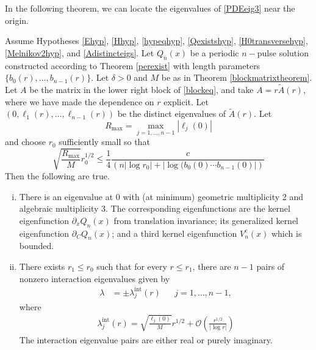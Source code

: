\documentclass[thesis.tex]{subfiles}
\begin{document}
In the following theorem, we can locate the eigenvalues of \eqref{PDEeig3} near the origin.


\begin{theorem}\label{locateeigtheorem}
Assume Hypotheses \ref{Ehyp}, \ref{Hhyp}, \ref{hypeqhyp}, \ref{Qexistshyp}, \ref{H0transversehyp}, \ref{Melnikov2hyp}, and \ref{Adistincteigs}. Let $Q_n(x)$ be a periodic $n-$pulse solution constructed according to Theorem \ref{perexist} with length parameters $\{ b_0(r), \dots, b_{n-1}(r)\}$. Let $\delta > 0$ and $M$ be as in Theorem \ref{blockmatrixtheorem}. Let $A$ be the matrix in the lower right block of \cref{blockeq}, and take $A = r \tilde{A}(r)$, where we have made the dependence on $r$ explicit. Let $(0, \ell_1(r), \dots, \ell_{n-1}(r))$ be the distinct eigenvalues of $\tilde{A}(r)$. Let
\begin{equation}
R_{\max} = \max_{j = 1, \dots, n-1} |\ell_j(0) |
\end{equation}
and choose $r_0$ sufficiently small so that
\begin{equation}\label{nobubblecondgen}
\sqrt{\frac{R_{\max}}{M}} r_0^{1/2} \leq \frac{1}{4} \frac{c}{\left( n |\log r_0| + |\log( b_0(0) \cdots b_{n-1}(0) | \right) }
\end{equation}
Then the following are true.

\begin{enumerate}[(i)]

\item There is an eigenvalue at 0 with (at minimum) geometric multiplicity 2 and algebraic multiplicity 3. The corresponding eigenfunctions are the kernel eigenfunction $\partial_x Q_n(x)$ from translation invariance; its generalized kernel eigenfunction $\partial_C Q_n(x)$; and a third kernel eigenfunction $V_n^c(x)$ which is bounded.

\item There exists $r_1 \leq r_0$ such that for every $r \leq r_1$, there are $n - 1$ pairs of nonzero interaction eigenvalues given by 
\begin{align*}
\lambda &= \pm \lambda^{\text{int}}_j(r) && j = 1, \dots, n-1,
\end{align*}
where
\begin{align*}
\lambda^{\text{int}}_j(r) = \sqrt{\frac{\ell_j(0)}{M}}r^{1/2} + \mathcal{O}\left( \frac{r^{1/2}}{|\log r|}\right)
\end{align*}
The interaction eigenvalue pairs are either real or purely imaginary.


\end{enumerate}
\end{theorem}
\end{document}
